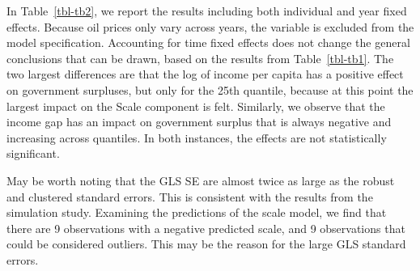 \documentclass[
  authoryear,
  review,
  1p]{elsarticle}
\begin{document}
In Table~\ref{tbl-tb2}, we report the results including both individual
and year fixed effects. Because oil prices only vary across years, the
variable is excluded from the model specification. Accounting for time
fixed effects does not change the general conclusions that can be drawn,
based on the results from Table~\ref{tbl-tb1}. The two largest
differences are that the log of income per capita has a positive effect
on government surpluses, but only for the 25th quantile, because at this
point the largest impact on the Scale component is felt. Similarly, we
observe that the income gap has an impact on government surplus that is
always negative and increasing across quantiles. In both instances, the
effects are not statistically significant.

May be worth noting that the GLS SE are almost twice as large as the
robust and clustered standard errors. This is consistent with the
results from the simulation study. Examining the predictions of the
scale model, we find that there are 9 observations with a negative
predicted scale, and 9 observations that could be considered outliers.
This may be the reason for the large GLS standard errors.
\end{document}
